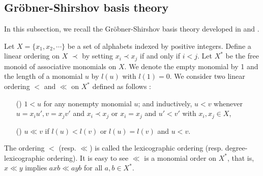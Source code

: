 \documentclass[a4paper,10pt]{amsart}
\theoremstyle{definition}
\theoremstyle{remark}
\numberwithin{equation}{section}
\begin{document}
\subsection{Gr\"{o}bner-Shirshov basis theory}
In this subsection, we recall the Gr\"{o}bner-Shirshov basis theory
developed in \cite{KL} and \cite{KLe}.

 Let $X=\{x_1, x_2, \cdots\}$ be a set of alphabets indexed by positive
integers. Define a linear ordering on $X$ $\prec$ by setting
$x_i\prec x_j$ if and only if $i<j$. Let $X^*$ be the free monoid of
associative monomials on $X$. We denote the empty monomial by 1 and
the length of a monomial $u$ by $l(u)$ with $l(1)=0$. We consider
two linear ordering $<$ and $\ll$ on $X^*$ defined as follows
\cite{KLe}:
\begin{enumerate}
  \item[({\romannumeral {1}})] $1<u$ for any nonempty monomial $u$; and
  inductively, $u<v$ whenever $u=x_iu', v=x_jv'$ and $x_i\prec x_j$ or
  $x_i=x_j$ and $u'<v'$ with $x_i, x_j\in X$,
  \item[({\romannumeral {2}})] $u\ll v$ if $l(u)<l(v)$ or $l(u)=l(v)$ and $u<v$.
\end{enumerate}
The ordering $<$ (resp. $\ll$) is called the lexicographic ordering
(resp. degree-lexicographic ordering). It is easy to see $\ll$ is a
monomial order on $X^*$, that is, $x\ll y$ implies $axb\ll ayb$ for
all $a, b\in X^*$.
\end{document}
